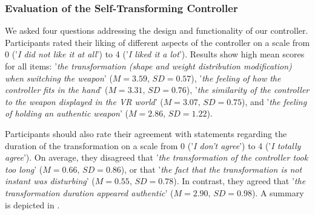 \documentclass{sigchi}
\begin{document}
\subsubsection{Evaluation of the Self-Transforming Controller}
We asked four questions addressing the design and functionality of our controller. 
Participants rated their liking of different aspects of the controller on a scale from 0 ('\textit{I did not like it at all}') to 4 ('\textit{I liked it a lot}'). Results show high mean scores for all items: '\textit{the transformation (shape and weight distribution modification) when switching the weapon}'
($M = 3.59,\,SD = 0.57$), '\textit{the feeling of how the controller fits in the hand}' 
($M = 3.31,\,SD = 0.76$), '\textit{the similarity of the controller to the weapon displayed in the VR world}' 
($M = 3.07,\,SD = 0.75$), and '\textit{the feeling of holding an authentic weapon}' 
($M = 2.86,\,SD = 1.22$).

Participants should also rate their agreement with statements regarding the duration of the transformation on a scale from 0 ('\textit{I don't agree}') to 4 ('\textit{I totally agree}'). On average, they disagreed that '\textit{the transformation of the controller took too long}'
($M = 0.66,\,SD = 0.86$), or that '\textit{the fact that the transformation is not instant was disturbing}'
($M = 0.55,\,SD = 0.78$). In contrast, they agreed that '\textit{the transformation duration appeared authentic}'
($M = 2.90,\,SD = 0.98$). A summary is depicted in .

\end{document}

